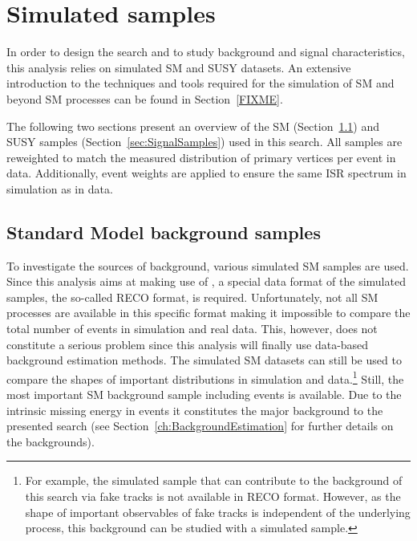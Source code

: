 
\FloatBarrier
\chapter{Simulated samples}
\label{ch:SimulatedSamples}

In order to design the search and to study background and signal characteristics, this analysis relies on simulated  SM and SUSY datasets.
An extensive introduction to the techniques and tools required for the simulation of SM and beyond SM processes can be found in Section~\ref{FIXME}.

The following two sections present an overview of the SM (Section~\ref{sec:SMSamples}) and SUSY samples (Section~\ref{sec:SignalSamples}) used in this search.
All samples are reweighted to match the measured distribution of primary vertices per event in data.
Additionally, event weights are applied to ensure the same ISR spectrum in simulation as in data.

\section{Standard Model background samples}
\label{sec:SMSamples}
To investigate the sources of background, various simulated SM samples are used.
Since this analysis aims at making use of \dedx, a special data format of the simulated samples, the so-called RECO format, is required.
Unfortunately, not all SM processes are available in this specific format making it impossible to compare the total number of events in simulation and real data.
This, however, does not constitute a serious problem since this analysis will finally use data-based background estimation methods.
The simulated SM datasets can still be used to compare the shapes of important distributions in simulation and data.\footnote{For example, the simulated \ZInvJets sample that can contribute to the background of this search via fake tracks is not available in RECO format. However, as the shape of important observables of fake tracks is independent of the underlying process, this background can be studied with a simulated \WJets sample.}
Still, the most important SM background sample including \WJets events is available.
Due to the intrinsic missing energy in \WJets events it constitutes the major background to the presented search (see Section~\ref{ch:BackgroundEstimation} for further details on the backgrounds). \\

